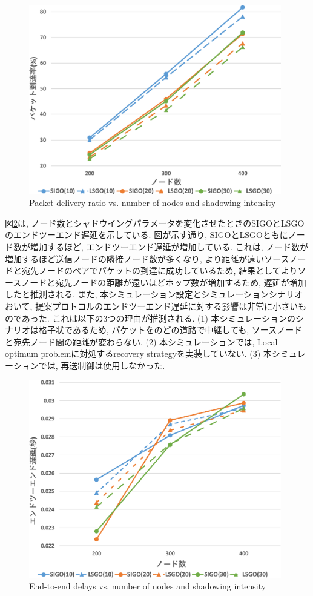 \documentclass[10pt]{jreport}
\begin{document}
\begin{figure}[!ht]
	\centering
	\includegraphics[width=110mm]{figures/SIGO_PDR.eps}
	\caption{Packet delivery ratio vs. number of nodes and shadowing intensity}
	\label{fig:SIGO_PDR}
\end{figure}

図\ref{fig:SIGO_delay}は, ノード数とシャドウイングパラメータを変化させたときのSIGOとLSGOのエンドツーエンド遅延を示している.
図が示す通り, SIGOとLSGOともにノード数が増加するほど, エンドツーエンド遅延が増加している. これは, ノード数が増加するほど送信ノードの隣接ノード数が多くなり, より距離が遠いソースノードと宛先ノードのペアでパケットの到達に成功しているため, 結果としてよりソースノードと宛先ノードの距離が遠いほどホップ数が増加するため, 遅延が増加したと推測される.
また, 本シミュレーション設定とシミュレーションシナリオおいて, 提案プロトコルのエンドツーエンド遅延に対する影響は非常に小さいものであった. これは以下の3つの理由が推測される. (1) 本シミュレーションのシナリオは格子状であるため, パケットをのどの道路で中継しても, ソースノードと宛先ノード間の距離が変わらない. (2) 本シミュレーションでは, Local optimum problemに対処するrecovery strategyを実装していない. (3) 本シミュレーションでは, 再送制御は使用しなかった. 

\begin{figure}[!ht]
	\centering
	\includegraphics[width=110mm]{figures/SIGO_delay.eps}
	\caption{End-to-end delays vs. number of nodes and shadowing intensity}
	\label{fig:SIGO_delay}
\end{figure}
\end{document}
